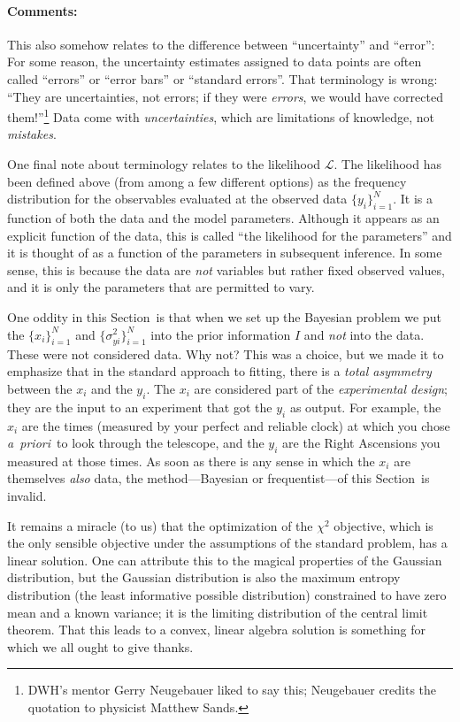 \documentclass[12pt,twoside]{article}
\newcommand{\notenglish}[1]{\textsl{#1}}
\newcommand{\apriori}{\notenglish{a~priori}}
\newcommand{\sectionname}{Section}
\newcommand{\commentsname}{Comments}
\newcounter{problem}
\newenvironment{comments}{\paragraph{\commentsname:}}{}
\newcommand{\setofall}[3]{\{{#1}\}_{{#2}}^{{#3}}}
\newcommand{\allx}{\setofall{x_i}{i=1}{N}}
\newcommand{\ally}{\setofall{y_i}{i=1}{N}}
\newcommand{\allsigmay}{\setofall{\sigma_{yi}^2}{i=1}{N}}
\newcommand{\like}{\mathscr{L}}
\begin{document}
\begin{comments}
This also somehow relates to the difference between ``uncertainty''
and ``error'': For some reason, the uncertainty estimates assigned to
data points are often called ``errors'' or ``error bars'' or
``standard errors''.  That terminology is wrong: ``They are
uncertainties, not errors; if they were \emph{errors}, we would have
corrected them!''\footnote{DWH's mentor Gerry Neugebauer liked to say
  this; Neugebauer credits the quotation to physicist Matthew Sands.}
Data come with \emph{uncertainties}, which are limitations of
knowledge, not \emph{mistakes}.

One final note about terminology relates to the likelihood $\like$.
The likelihood has been defined above (from among a few different
options) as the frequency distribution for the observables evaluated
at the observed data $\ally$.  It is a function of both the data and
the model parameters.  Although it appears as an explicit function of
the data, this is called ``the likelihood for the parameters'' and it
is thought of as a function of the parameters in subsequent inference.
In some sense, this is because the data are \emph{not} variables but
rather fixed observed values, and it is only the parameters that are
permitted to vary.

One oddity in this \sectionname\ is that when we set up the Bayesian
problem we put the $\allx$ and $\allsigmay$ into the prior information
$I$ and \emph{not} into the data.  These were not considered data.
Why not?  This was a choice, but we made it to emphasize that in the
standard approach to fitting, there is a \emph{total asymmetry}
between the $x_i$ and the $y_i$.  The $x_i$ are considered part of the
\emph{experimental design}; they are the input to an experiment that
got the $y_i$ as output.  For example, the $x_i$ are the times
(measured by your perfect and reliable clock) at which you chose
\apriori\ to look through the telescope, and the $y_i$ are the Right
Ascensions you measured at those times.  As soon as there is any sense
in which the $x_i$ are themselves \emph{also} data, the
method---Bayesian or frequentist---of this \sectionname\ is invalid.

It remains a miracle (to us) that the optimization of the $\chi^2$
objective, which is the only sensible objective under the assumptions
of the standard problem, has a linear solution.  One can attribute
this to the magical properties of the Gaussian distribution, but the
Gaussian distribution is also the maximum entropy distribution (the
least informative possible distribution) constrained to have zero mean
and a known variance; it is the limiting distribution of the central
limit theorem.  That this leads to a convex, linear algebra solution
is something for which we all ought to give thanks.
\end{comments}
\end{document}
